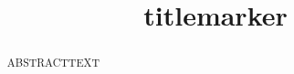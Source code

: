 \documentclass[twocolumn, serif, articletypemarker, citationstylemarker]{jote-article}
\title{titlemarker}
\begin{document}
\begin{frontmatter}
\maketitle
\begin{abstract}
  ABSTRACTTEXT
\end{abstract}
\end{frontmatter}
\end{document}
